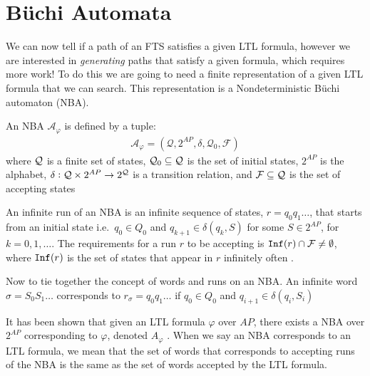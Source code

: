 \section{B\"{u}chi Automata}
We can now tell if a path of an FTS satisfies a given LTL formula, however we are interested in \textit{generating} paths that satisfy a given formula, which requires more work! To do this we are going to need a finite representation of a given LTL formula that we can search. This representation is a Nondeterministic B\"{u}chi automaton (NBA). 
\begin{definition}
\label{defNBA}
An NBA $\mathcal{A}_\varphi$ is defined by a tuple:
\begin{align*}
\mathcal{A}_\varphi = (\mathcal{Q},2^{AP},\delta,\mathcal{Q}_0,\mathcal{F})
\end{align*}
where $\mathcal{Q}$ is a finite set of states, $\mathcal{Q}_0 \subseteq \mathcal{Q}$ is the set of initial states, $2^{AP}$ is the alphabet, $\delta: \mathcal{Q} \times 2^{AP} \rightarrow 2^{\mathcal{Q}}$ is a transition relation, and $\mathcal{F} \subseteq \mathcal{Q}$ is the set of accepting states
\end{definition} 
An infinite run of an NBA is an infinite sequence of states, $r=q_0 q_1 \dots$, that starts from an initial state i.e.\ $q_0 \in Q_0$ and $q_{k+1} \in \delta(q_k, S)$ for some $S \in 2^{AP}$, for $k = 0,1,\dots$. The requirements for a run $r$ to be accepting is $\texttt{Inf}(r) \cap \mathcal{F} \neq \emptyset$, where $\texttt{Inf}(r)$ is the set of states that appear in $r$ infinitely often \cite{guo15}. 

Now to tie together the concept of words and runs on an NBA. An infinite word $\sigma = S_0 S_1 \dots$ corresponds to $r_\sigma = q_0 q_1 \dots$ if $q_0 \in Q_0$ and $q_{i+1} \in \delta(q_i,S_i)$

It has been shown that given an LTL formula $\varphi$ over $AP$, there exists a NBA over $2^{AP}$ corresponding to $\varphi$, denoted $A_\varphi$ \cite{baier08}. When we say an NBA corresponds to an LTL formula, we mean that the set of words that corresponds to accepting runs of the NBA is the same as the set of words accepted by the LTL formula.  

